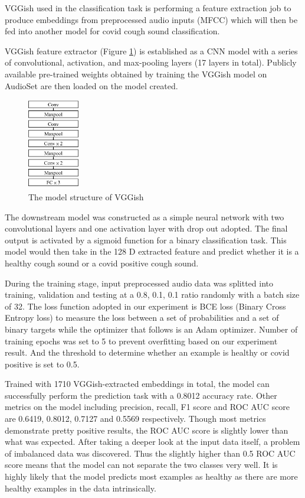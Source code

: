 \documentclass[11pt]{article}
\begin{document}
VGGish used in the classification task is performing a feature extraction job to produce embeddings from preprocessed audio inputs (MFCC) which will then be fed into another model for covid cough sound classification. 

VGGish feature extractor (Figure \ref{fig:vggish}) is established as a CNN model with a series of convolutional, activation, and max-pooling layers (17 layers in total). Publicly available pre-trained weights obtained by training the VGGish model on AudioSet are then loaded on the model created. 

\begin{figure}[htbp]{}
	\centering
    \includegraphics[width=0.2\textwidth]{./imgs/vggish.png} %
    \caption{The model structure of VGGish}
    \label{fig:vggish}
\end{figure}

The downstream model was constructed as a simple neural network with two convolutional layers and one activation layer with drop out adopted. The final output is activated by a sigmoid function for a binary classification task. This model would then take in the 128 D extracted feature and predict whether it is a healthy cough sound or a covid positive cough sound. 

During the training stage, input preprocessed audio data was splitted into training, validation and testing at a 0.8, 0.1, 0.1 ratio randomly with a batch size of 32. The loss function adopted in our experiment is BCE loss (Binary Cross Entropy loss) to measure the loss between a set of probabilities and a set of binary targets while the optimizer that follows is an Adam optimizer. Number of training epochs was set to 5 to prevent overfitting based on our experiment result. And the threshold to determine whether an example is healthy or covid positive is set to 0.5.

Trained with 1710 VGGish-extracted embeddings in total, the model can successfully perform the prediction task with a 0.8012 accuracy rate. Other metrics on the model including precision, recall, F1 score and ROC AUC score are 0.6419, 0.8012, 0.7127 and 0.5569 respectively. Though most metrics demonstrate pretty positive results, the ROC AUC score is slightly lower than what was expected. After taking a deeper look at the input data itself, a problem of imbalanced data was discovered. Thus the slightly higher than 0.5 ROC AUC score means that the model can not separate the two classes very well. It is highly likely that the model predicts most examples as healthy as there are more healthy examples in the data intrinsically.
\end{document}
